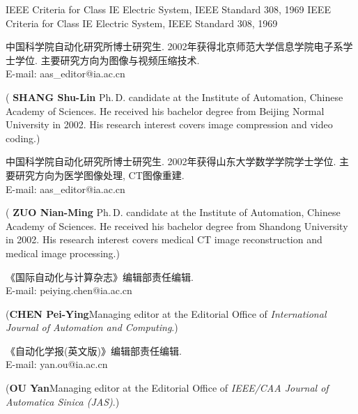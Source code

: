 \documentclass{Style/aas}
\begin{document}
\begin{multicols}{2}
\begin{thebibliography}{99}
     IEEE Criteria for Class IE Electric System, IEEE Standard 308, 1969
     IEEE Criteria for Class IE Electric System, IEEE Standard 308, 1969
  \end{thebibliography}

  \begin{biography}
    \quad
    中国科学院自动化研究所博士研究生.
    2002年获得北京师范大学信息学院电子系学士学位.
    主要研究方向为图像与视频压缩技术.\\E-mail: aas\_editor@ia.ac.cn

    \noindent({\bf
      SHANG Shu-Lin
    }\quad
    Ph.\,D. candidate at the
    Institute of Automation, Chinese Academy of Sciences. He received
    his bachelor degree from Beijing Normal University in 2002. His research
    interest covers image compression and video coding.)
  \end{biography}

  \begin{biography}
    \quad
    中国科学院自动化研究所博士研究生.
    2002年获得山东大学数学学院学士学位.
    主要研究方向为医学图像处理, CT图像重建.\\E-mail: aas\_editor@ia.ac.cn

    \noindent({\bf
      ZUO Nian-Ming
    }\quad
    Ph.\,D. candidate at the
    Institute of Automation, Chinese Academy of Sciences. He received
    his bachelor degree from Shandong University in 2002. His research
    interest covers medical CT image reconstruction and medical image
    processing.)
  \end{biography}

  \begin{biographynophoto}
    \quad 《国际自动化与计算杂志》编辑部责任编辑.\\E-mail: peiying.chen@ia.ac.cn

    \noindent({\bf CHEN Pei-Ying}\quad Managing editor at the Editorial Office of
    {\sl International Journal of Automation and Computing}.)
  \end{biographynophoto}

  \begin{biographynophoto}
    \quad 《自动化学报(英文版)》编辑部责任编辑.\\E-mail: yan.ou@ia.ac.cn

    \noindent({\bf OU Yan}\quad Managing editor at the Editorial Office of
      {\sl IEEE/CAA Journal of Automatica Sinica (JAS)}.)
  \end{biographynophoto}


\end{multicols}
\end{document}
